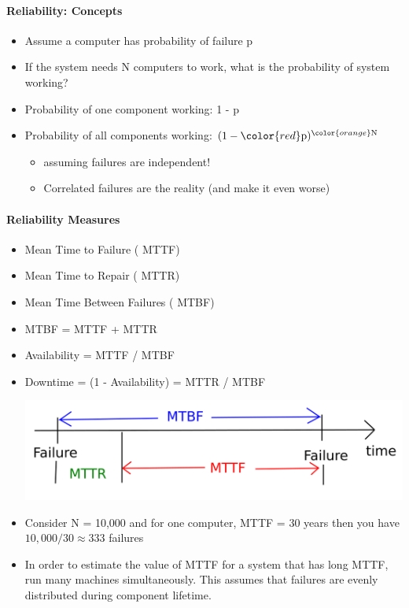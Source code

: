 \paragraph{Reliability: Concepts}

\begin{itemize}
\item Assume a computer has probability of failure {\color{red} p}
\item If the system needs {\color{orange} N } computers
  to work, what is the probability of
  system working?
\end{itemize}

\begin{itemize}
\item Probability of one component working: 1 - {\color{red} p}
\item Probability of all components working:
  $(1 - {\color{red} \text{p}})^{{\color{orange} \text{N}}}$
  \begin{itemize}
  \item assuming failures are independent!
  \item Correlated failures are the reality (and make it even worse)
  \end{itemize}
\end{itemize}


\paragraph{Reliability Measures}

\begin{itemize}
\item Mean Time to Failure ({\color{red} MTTF})
\item Mean Time to Repair ({\color{green} MTTR})
\item Mean Time Between Failures ({\color{blue} MTBF})
\item {\color{blue} MTBF} = {\color{red} MTTF} + {\color{green} MTTR}
\item Availability = {\color{red} MTTF} / {\color{blue} MTBF}
\item Downtime = (1 - Availability) =
  {\color{green} MTTR} / {\color{blue} MTBF}

\includegraphics[scale=0.15]{graphics/reliability-measures.png}

\item Consider {\color{orange} N = 10,000} and for one computer,
  {\color{red} MTTF = 30 years} then
  you have $10,000 / 30 \approx 333$ failures

\item In order to estimate the value of MTTF for
  a system that has long MTTF, run many machines simultaneously.
  This assumes that failures are evenly distributed during
  component lifetime.
\end{itemize}

